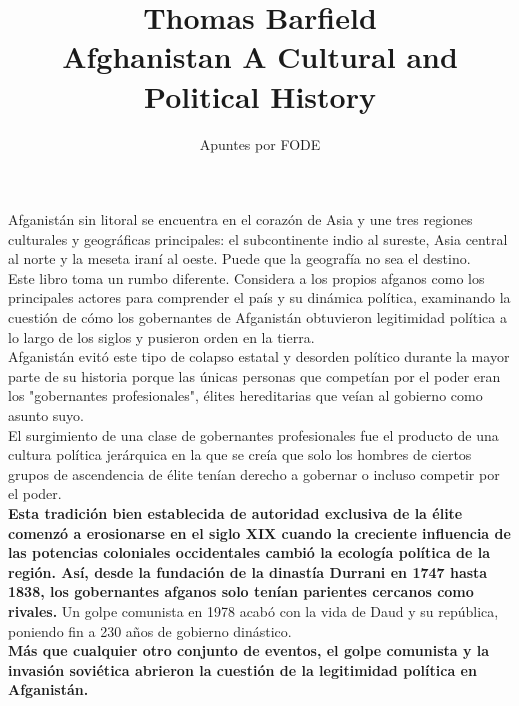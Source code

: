 \documentclass[10pt]{book}
\begin{document}
\normalfont

\author{\Large Apuntes por FODE}
\title{\small Thomas Barfield \\ \vspace{1cm} \large Afghanistan A Cultural and Political History}
\date{}
\pagestyle{empty}
\maketitle
\thispagestyle{empty}
\let\cleardoublepage\clearpage
\tableofcontents								%


 
\let\cleardoublepage\clearpage


Afganistán sin litoral se encuentra en el corazón de Asia y une tres regiones culturales y geográficas principales: el subcontinente indio al sureste, Asia central al norte y la meseta iraní al oeste. Puede que la geografía no sea el destino.\\
Este libro toma un rumbo diferente. Considera a los propios afganos como los principales actores para comprender el país y su dinámica política, examinando la cuestión de cómo los gobernantes de Afganistán obtuvieron legitimidad política a lo largo de los siglos y pusieron orden en la tierra.\\
Afganistán evitó este tipo de colapso estatal y desorden político durante la mayor parte de su historia porque las únicas personas que competían por el poder eran los "gobernantes profesionales", élites hereditarias que veían al gobierno como asunto suyo.\\
El surgimiento de una clase de gobernantes profesionales fue el producto de una cultura política jerárquica en la que se creía que solo los hombres de ciertos grupos de ascendencia de élite tenían derecho a gobernar o incluso competir por el poder.\\
\textbf{Esta tradición bien establecida de autoridad exclusiva de la élite comenzó a erosionarse en el siglo XIX cuando la creciente influencia de las potencias coloniales occidentales cambió la ecología política de la región. Así, desde la fundación de la dinastía Durrani en 1747 hasta 1838, los gobernantes afganos solo tenían parientes cercanos como rivales.} Un golpe comunista en 1978 acabó con la vida de Daud y su república, poniendo fin a 230 años de gobierno dinástico.\\
\textbf{Más que cualquier otro conjunto de eventos, el golpe comunista y la invasión soviética abrieron la cuestión de la legitimidad política en Afganistán.}\\
\end{document}
